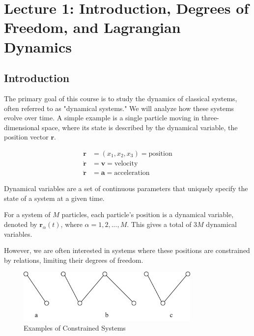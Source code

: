 \setcounter{section}{0}

\section{Lecture 1: Introduction, Degrees of Freedom, and Lagrangian Dynamics}

\subsection{Introduction}

The primary goal of this course is to study the dynamics of classical systems, often 
referred to as "dynamical systems." We will analyze how these systems evolve over time.
A simple example is a single particle moving in three-dimensional space, where its state 
is described by the dynamical variable, the position vector $\mathbf{r}$.

\begin{align}
    \mathbf{r} &= (x_1, x_2, x_3) = \text{position} \\
    \dot{\mathbf{r}} &= \mathbf{v} = \text{velocity}\\
    \ddot{\mathbf{r}} &= \mathbf{a} = \text{acceleration}
\end{align}

\begin{definition}
    Dynamical variables are a set of continuous parameters that uniquely specify the 
    state of a system at a given time.
\end{definition}

For a system of $M$ particles, each particle's position is a dynamical variable, denoted by $\mathbf{r}_\alpha(t)$, where $\alpha = 1, 2, ..., M$. This gives a total of $3M$ dynamical variables.

However, we are often interested in systems where these positions are constrained by relations, limiting their degrees of freedom.

\begin{figure}[ht]
    \centering
    \includegraphics[width=0.8\textwidth]{images/1-1-1.png}
    \caption{Examples of Constrained Systems}
    \label{fig:1-1-1}
\end{figure}

